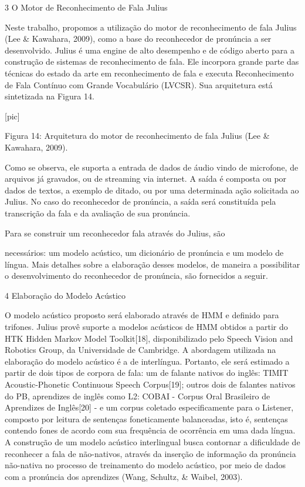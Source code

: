 3 O Motor de Reconhecimento de Fala Julius

Neste trabalho, propomos a utiliza\c{c}\~ao do motor de reconhecimento de fala
Julius (Lee \& Kawahara, 2009), como a base do reconhecedor de pron\'uncia
a ser desenvolvido. Julius \'e uma engine de alto desempenho e de c\'odigo
aberto para a constru\c{c}\~ao de sistemas de reconhecimento de fala. Ele
incorpora grande parte das t\'ecnicas do estado da arte em reconhecimento
de fala e executa Reconhecimento de Fala Cont\'inuo com Grande Vocabul\'ario
(LVCSR). Sua arquitetura est\'a sintetizada na Figura 14.

                                [pic]

Figura 14: Arquitetura do motor de reconhecimento de fala Julius (Lee \&
Kawahara, 2009).

Como se observa, ele suporta a entrada de dados de \'audio vindo de
microfone, de arquivos j\'a gravados, ou de streaming via internet. A
sa\'ida \'e composta ou por dados de textos, a exemplo de ditado, ou por uma
determinada a\c{c}\~ao solicitada ao Julius. No caso do reconhecedor de
pron\'uncia, a sa\'ida ser\'a constitu\'ida pela transcri\c{c}\~ao da fala e da
avalia\c{c}\~ao de sua pron\'uncia.

  Para  se  construir  um  reconhecedor  fala  atrav\'es  do  Julius,  s\~ao

necess\'arios: um modelo ac\'ustico, um dicion\'ario de pron\'uncia e um modelo
de l\'ingua. Mais detalhes sobre a elabora\c{c}\~ao desses modelos, de maneira a
possibilitar o desenvolvimento do reconhecedor de pron\'uncia, s\~ao
fornecidos a seguir.

4 Elabora\c{c}\~ao do Modelo Ac\'ustico

O modelo ac\'ustico proposto ser\'a elaborado atrav\'es de HMM e definido para
trifones. Julius prov\^e suporte a modelos ac\'usticos de HMM obtidos a
partir do HTK Hidden Markov Model Toolkit{[}18{]}, disponibilizado pelo
Speech Vision and Robotics Group, da Universidade de Cambridge. A
abordagem utilizada na elabora\c{c}\~ao do modelo ac\'ustico \'e a de interl\'ingua.
Portanto, ele ser\'a estimado a partir de dois tipos de corpora de fala:
um de falante nativos do ingl\^es: TIMIT Acoustic-Phonetic Continuous
Speech Corpus{[}19{]}; outros dois de falantes nativos do PB, aprendizes
de ingl\^es como L2: COBAI - Corpus Oral Brasileiro de Aprendizes de
Ingl\^es{[}20{]} - e um corpus coletado especificamente para o Listener,
composto por leitura de senten\c{c}as foneticamente balanceadas, isto \'e,
senten\c{c}as contendo fones de acordo com sua frequ\^encia de ocorr\^encia em
uma dada l\'ingua. A constru\c{c}\~ao de um modelo ac\'ustico interlingual busca
contornar a dificuldade de reconhecer a fala de n\~ao-nativos, atrav\'es da
inser\c{c}\~ao de informa\c{c}\~ao da pron\'uncia n\~ao-nativa no processo de
treinamento do modelo ac\'ustico, por meio de dados com a pron\'uncia dos
aprendizes (Wang, Schultz, \& Waibel, 2003).

